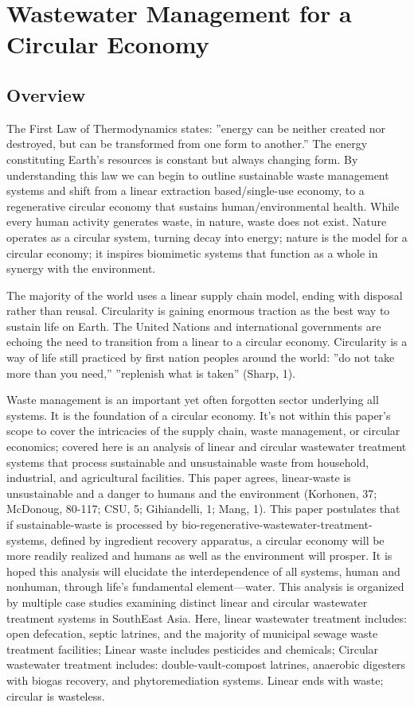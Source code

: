 \chapter{Wastewater Management for a Circular Economy}

\section{Overview}

The First Law of Thermodynamics states: ''energy can be neither created nor destroyed, but can be transformed from one form to another.'' The energy constituting Earth’s resources is constant but always changing form. By understanding this law we can begin to outline sustainable waste management systems and shift from a linear extraction based/single-use economy, to a regenerative circular economy that sustains human/environmental health. While every human activity generates waste, in nature, waste does not exist. Nature operates as a circular system, turning decay into energy; nature is the model for a circular economy; it inspires biomimetic systems that function as a whole in synergy with the environment. 

The majority of the world uses a linear supply chain model, ending with disposal rather than reusal. Circularity is gaining enormous traction as the best way to sustain life on Earth. The United Nations and international governments are echoing the need to transition from a linear to a circular economy. Circularity is a way of life still practiced by first nation peoples around the world: ''do not take more than you need,'' ''replenish what is taken'' (Sharp, 1). 

Waste management is an important yet often forgotten sector underlying all systems. It is the foundation of a circular economy. It’s not within this paper’s scope to cover the intricacies of the supply chain, waste management, or circular economics; covered here is an analysis of linear and circular wastewater treatment systems that process sustainable and unsustainable waste from household, industrial, and agricultural facilities. This paper agrees, linear-waste is unsustainable and a danger to humans and the environment (Korhonen, 37; McDonoug, 80-117; CSU, 5; Gihiandelli, 1; Mang, 1). This paper postulates that if sustainable-waste is processed by bio-regenerative-wastewater-treatment-systems, defined by ingredient recovery apparatus, a circular economy will be more readily realized and humans as well as the environment will prosper. It is hoped this analysis will elucidate the interdependence of all systems, human and nonhuman, through life's fundamental element––water. This analysis is organized by multiple case studies examining distinct linear and circular wastewater treatment systems in SouthEast Asia. Here, linear wastewater treatment includes: open defecation, septic latrines, and the majority of municipal sewage waste treatment facilities; Linear waste includes pesticides and chemicals; Circular wastewater treatment includes: double-vault-compost latrines, anaerobic digesters with biogas recovery, and phytoremediation systems. Linear ends with waste; circular is wasteless. 


